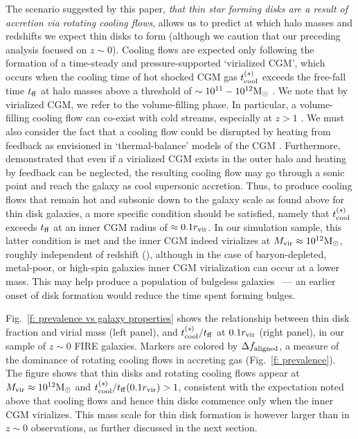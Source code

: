 \documentclass[fleqn,usenatbib]{mnras}
\newcommand{\Rvir}{r_{\rm vir}}
\newcommand{\msun}{{\rm M}_\odot}
\begin{document}
The scenario suggested by this paper, \textit{that thin star forming disks are a result of accretion via rotating cooling flows}, allows us to predict at which halo masses and redshifts we expect thin disks to form (although we caution that our preceding analysis focused on $z\sim 0$).
Cooling flows are expected only following the formation of a time-steady and pressure-supported `virialized CGM', which occurs when the cooling time of hot shocked CGM gas $t_{\rm cool}^{(s)}$ exceeds the free-fall time $t_{\rm ff}$ at halo masses above a threshold of $\sim10^{11}-10^{12}\msun$ \citep{White1978, White1991, Birnboim2003}. 
We note that by virialized CGM, we refer to the volume-filling phase.
In particular, a volume-filling cooling flow can co-exist with cold streams, especially at $z>1$ \cite[e.g.,][]{Keres2005,Dekel2006, Dekel2009}.
We must also consider the fact that a cooling flow could be disrupted by heating from feedback as envisioned in `thermal-balance'  models of the CGM \citep[e.g.,][]{Mccourt2012, Sharma2012, Voit2017, Faerman2017, Faerman2020}.
Furthermore, \cite{Stern2019} demonstrated that even if a virialized CGM exists in the outer halo and heating by feedback can be neglected, the resulting cooling flow may go through a sonic point and reach the galaxy as cool supersonic accretion.
Thus, to produce cooling flows that remain hot and subsonic down to the galaxy scale as found above for thin disk galaxies, a more specific condition should be satisfied, namely that $t_{\rm cool}^{(s)}$ exceeds $t_{\rm ff}$ at an inner CGM radius of $\approx0.1 r_{\rm vir}$.
In our simulation sample, this latter condition is met and the inner CGM indeed virializes at $\Mvir\approx10^{12}\msun$, roughly independent of redshift (\citealt{Stern2021}), although in the case of baryon-depleted, metal-poor, or high-spin galaxies inner CGM virialization can occur at a lower mass.
This may help produce a population of bulgeless galaxies~\citep[e.g.][]{Kormendy2010, Peebles2020} --- an earlier onset of disk formation would reduce the time spent forming bulges.

Fig.~\ref{f: prevalence vs galaxy properties} shows the relationship between thin disk fraction and virial mass (left panel), and $t_{\rm cool}^{(s)}/t_{\rm ff}$ at $0.1 r_{\rm vir}$ (right panel), in our sample of $z\sim0$ FIRE galaxies.
Markers are colored by $\Delta f_{\rm aligned}$, a measure of the dominance of rotating cooling flows in accreting gas (Fig.~\ref{f: prevalence}).
The figure shows that thin disks and rotating cooling flows appear at $M_{\rm vir}\approx 10^{12}\msun$ and $\tcoolsh/\tff(0.1\Rvir)>1$, consistent with the expectation noted above that cooling flows and hence thin disks commence only when the inner CGM virializes.
This mass scale for thin disk formation is however larger than in $z\sim0$ observations, as further discussed in the next section.
\end{document}
